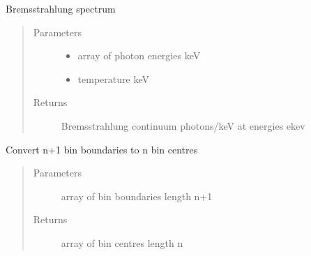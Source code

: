 \documentclass[letterpaper,10pt,english]{sphinxmanual}
\begin{document}
\begin{fulllineitems}
\label{\detokenize{astro_functions:astro.brems}}
Bremsstrahlung spectrum
\begin{quote}\begin{description}
\item[{Parameters}] \leavevmode\begin{itemize}
\item {} 
 \textendash{} array of photon energies keV

\item {} 
 \textendash{} temperature keV

\end{itemize}

\item[{Returns}] \leavevmode
Bremsstrahlung continuum photons/keV at energies ekev

\end{description}\end{quote}

\end{fulllineitems}


\begin{fulllineitems}
\label{\detokenize{astro_functions:astro.btoc}}
Convert n+1 bin boundaries to n bin centres
\begin{quote}\begin{description}
\item[{Parameters}] \leavevmode
{} \textendash{} array of bin boundaries length n+1

\item[{Returns}] \leavevmode
array of bin centres length n

\end{description}\end{quote}

\end{fulllineitems}

\end{document}
